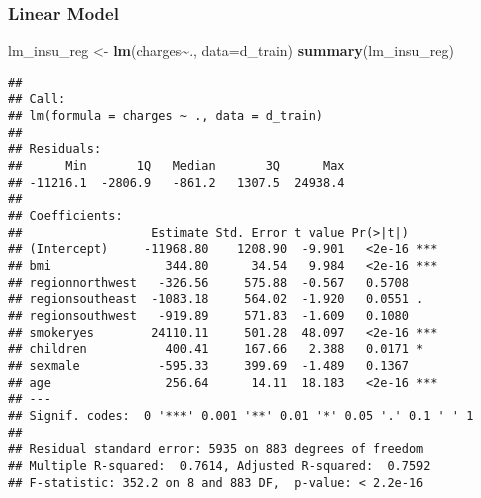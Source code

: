 \documentclass[
]{article}
\newenvironment{Shaded}{\begin{snugshade}}{\end{snugshade}}
\newcommand{\AttributeTok}[1]{\textcolor[rgb]{0.13,0.29,0.53}{#1}}
\newcommand{\DecValTok}[1]{\textcolor[rgb]{0.00,0.00,0.81}{#1}}
\newcommand{\FunctionTok}[1]{\textcolor[rgb]{0.13,0.29,0.53}{\textbf{#1}}}
\newcommand{\NormalTok}[1]{#1}
\newcommand{\OtherTok}[1]{\textcolor[rgb]{0.56,0.35,0.01}{#1}}
\newcommand{\SpecialCharTok}[1]{\textcolor[rgb]{0.81,0.36,0.00}{\textbf{#1}}}
\begin{document}
\begin{Shaded}
\end{Shaded}

\hypertarget{linear-model}{%
\subsubsection{Linear Model}\label{linear-model}}

\begin{Shaded}
\begin{Highlighting}[]
\NormalTok{lm\_insu\_reg }\OtherTok{\textless{}{-}} \FunctionTok{lm}\NormalTok{(charges}\SpecialCharTok{\textasciitilde{}}\NormalTok{., }\AttributeTok{data=}\NormalTok{d\_train)}
\FunctionTok{summary}\NormalTok{(lm\_insu\_reg)}
\end{Highlighting}
\end{Shaded}

\begin{verbatim}
## 
## Call:
## lm(formula = charges ~ ., data = d_train)
## 
## Residuals:
##      Min       1Q   Median       3Q      Max 
## -11216.1  -2806.9   -861.2   1307.5  24938.4 
## 
## Coefficients:
##                  Estimate Std. Error t value Pr(>|t|)    
## (Intercept)     -11968.80    1208.90  -9.901   <2e-16 ***
## bmi                344.80      34.54   9.984   <2e-16 ***
## regionnorthwest   -326.56     575.88  -0.567   0.5708    
## regionsoutheast  -1083.18     564.02  -1.920   0.0551 .  
## regionsouthwest   -919.89     571.83  -1.609   0.1080    
## smokeryes        24110.11     501.28  48.097   <2e-16 ***
## children           400.41     167.66   2.388   0.0171 *  
## sexmale           -595.33     399.69  -1.489   0.1367    
## age                256.64      14.11  18.183   <2e-16 ***
## ---
## Signif. codes:  0 '***' 0.001 '**' 0.01 '*' 0.05 '.' 0.1 ' ' 1
## 
## Residual standard error: 5935 on 883 degrees of freedom
## Multiple R-squared:  0.7614, Adjusted R-squared:  0.7592 
## F-statistic: 352.2 on 8 and 883 DF,  p-value: < 2.2e-16
\end{verbatim}
\end{document}
